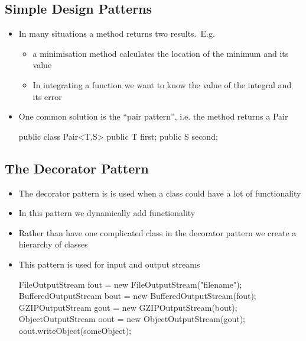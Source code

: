 
\begin{slide}
\section{Simple Design Patterns}

\begin{PauseHighLight}
  \begin{itemize}
  \item In many situations a method returns two results.\pause\ E.g.
    \begin{itemize}
    \item a minimisation method calculates the location of the
      minimum and its value\pause
    \item In integrating a function we want to know the value of the
      integral and its error\pause
    \end{itemize}
  \item One common solution is the ``pair pattern'', i.e. the method
    returns a Pair
    \begin{java}
      public class Pair<T,S>
      {
        public T first;
        public S second;
      }
    \end{java}\pause
  \end{itemize}
\end{PauseHighLight}

\end{slide}


\begin{slide}
\section[-1]{The Decorator Pattern}

\begin{PauseHighLight}
  \begin{itemize}
  \item The decorator pattern is is used when a class could have a lot of
    functionality\pause
  \item In this pattern we dynamically add functionality\pause
  \item Rather than have one complicated class in the decorator pattern we
    create a hierarchy of classes\pause
  \item This pattern is used for input and output streams
    \begin{java}
      FileOutputStream fout = new FileOutputStream("filename");
      BufferedOutputStream bout = new BufferedOutputStream(fout);
      GZIPOutputStream gout = new GZIPOutputStream(bout);
      ObjectOutputStream oout = new ObjectOutputStream(gout);
      oout.writeObject(someObject);
    \end{java}\pause
  \end{itemize}
\end{PauseHighLight}
\end{slide}

